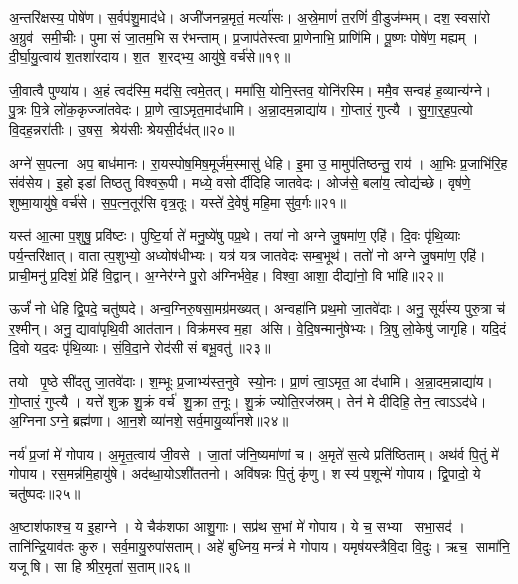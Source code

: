अ॒न्तरि॑क्षस्य॒ पोषे॑ण।
स॒र्वप॑शु॒माद॑धे।
अजी॑जनन्न॒मृतं॒ मर्त्या॑सः।
अ॒स्रे॒माणं॑ त॒रणिं॑ वी॒डुज॑म्भम्।
दश॒ स्वसा॑रो अ॒ग्रुव॑ समी॒चीः।
पुमासं जा॒तम॒भि सर॑भन्ताम्।
प्र॒जाप॑तेस्त्वा प्रा॒णेनाभि॒ प्राणि॑मि।
पू॒ष्णः पोषे॑ण॒ मह्यम्।
दी॒र्घा॒यु॒त्वाय॑ श॒तशा॑रदाय।
श॒त श॒रद्भ्य॒ आयु॑षे॒ वर्च॑से॥१९॥

जी॒वात्वै पुण्या॑य।
अ॒हं त्वद॑स्मि॒ मद॑सि॒ त्वमे॒तत्।
ममा॑सि॒ योनि॒स्तव॒ योनि॑रस्मि।
ममै॒व सन्वह॑ ह॒व्यान्य॑ग्ने।
पु॒त्रः पि॒त्रे लो॑क॒कृज्जा॑तवेदः।
प्रा॒णे त्वा॒ऽमृत॒माद॑धामि।
अ॒न्ना॒दम॒न्नाद्या॑य।
गो॒प्तारं॒ गुप्त्यै।
सु॒गा॒र्॒ह॒प॒त्यो वि॒दह॒न्नरा॑तीः।
उ॒षस॒ श्रेय॑सीः श्रेयसी॒र्दध॑त्॥२०॥

अग्ने॑ स॒पत्ना अप॒ बाध॑मानः।
रा॒यस्पोष॒मिष॒मूर्ज॑म॒स्मासु॑ धेहि।
इ॒मा उ॒ मामुप॑तिष्ठन्तु॒ राय॑।
आ॒भिः प्र॒जाभि॑रि॒ह संव॑सेय।
इ॒हो इडा॑ तिष्ठतु विश्वरू॒पी।
मध्ये॒ वसोर्दीदिहि जातवेदः।
ओज॑से॒ बला॑य॒ त्वोद्य॑च्छे।
वृष॑णे॒ शुष्मा॒यायु॑षे॒ वर्च॑से।
स॒प॒त्न॒तूर॑सि वृत्र॒तूः।
यस्ते॑ दे॒वेषु॑ महि॒मा सु॑व॒र्गः॥२१॥

यस्त॑ आ॒त्मा प॒शुषु॒ प्रवि॑ष्टः।
पुष्टि॒र्या ते॑ मनु॒ष्ये॑षु पप्र॒थे।
तया॑ नो अग्ने जु॒षमा॑ण॒ एहि॑।
दि॒वः पृ॑थि॒व्याः पर्य॒न्तरि॑क्षात्।
वातात्प॒शुभ्यो॒ अध्योष॑धीभ्यः।
यत्र॑ यत्र जातवेदः सम्ब॒भूथ॑।
ततो॑ नो अग्ने जु॒षमा॑ण॒ एहि॑।
प्राची॒मनु॑ प्र॒दिशं॒ प्रेहि॑ वि॒द्वान्।
अ॒ग्नेर॑ग्ने पु॒रो अ॑ग्निर्भवे॒ह।
विश्वा॒ आशा॒ दीद्या॑नो॒ वि भा॑हि॥२२॥

ऊर्जं॑ नो धेहि द्वि॒पदे॒ चतु॑ष्पदे।
अन्व॒ग्निरु॒षसा॒मग्र॑मख्यत्।
अन्वहा॑नि प्रथ॒मो जा॒तवे॑दाः।
अनु॒ सूर्य॑स्य पुरु॒त्रा च॑ र॒श्मीन्।
अनु॒ द्यावा॑पृथि॒वी आत॑तान।
विक्र॑मस्व म॒हा अ॑सि।
वे॒दि॒षन्मानु॑षेभ्यः।
त्रि॒षु लो॒केषु॑ जागृहि।
यदि॒दं दि॒वो यद॒दः पृ॑थि॒व्याः।
सं॒वि॒दा॒ने रोद॑सी सं बभू॒वतु॑॥२३॥

तयो पृ॒ष्ठे सी॑दतु जा॒तवे॑दाः।
श॒म्भूः प्र॒जाभ्य॑स्त॒नुवे स्यो॒नः।
प्रा॒णं त्वा॒ऽमृत॒ आ द॑धामि।
अ॒न्ना॒दम॒न्नाद्या॑य।
गो॒प्तारं॒ गुप्त्यै।
यत्ते॑ शुक्र शु॒क्रं वर्च॑ शु॒क्रा त॒नूः।
शु॒क्रं ज्योति॒रज॑स्रम्।
तेन॑ मे दीदिहि॒ तेन॒ त्वाऽऽद॑धे।
अ॒ग्निनाऽग्ने॒ ब्रह्म॑णा।
आ॒न॒शे व्या॑नशे॒ सर्व॒मायु॒र्व्या॑नशे॥२४॥

नर्य॑ प्र॒जां मे॑ गोपाय।
अ॒मृ॒त॒त्वाय॑ जी॒वसे।
जा॒तां ज॑नि॒ष्यमा॑णां च।
अ॒मृते॑ स॒त्ये प्रति॑ष्ठिताम्।
अथ॑र्व पि॒तुं मे॑ गोपाय।
रस॒मन्न॑मि॒हायु॑षे।
अद॑ब्धा॒योऽशी॑ततनो।
अवि॑षन्नः पि॒तुं कृ॑णु।
शस्य॑ प॒शून्मे॑ गोपाय।
द्वि॒पादो॒ ये चतु॑ष्पदः॥२५॥

अ॒ष्टाश॑फाश्च॒ य इ॒हाग्ने।
ये चैक॑शफा आशु॒गाः।
सप्र॑थ स॒भां मे॑ गोपाय।
ये च॒ सभ्या सभा॒सद॑।
तानि॑न्द्रि॒याव॑तः कुरु।
सर्व॒मायु॒रुपा॑सताम्।
अहे॑ बुध्निय॒ मन्त्रं॑ मे गोपाय।
यमृष॑यस्त्रैवि॒दा वि॒दुः।
ऋच॒ सामा॑नि॒ यजूषि।
सा हि श्रीर॒मृता॑ स॒ताम्॥२६॥

